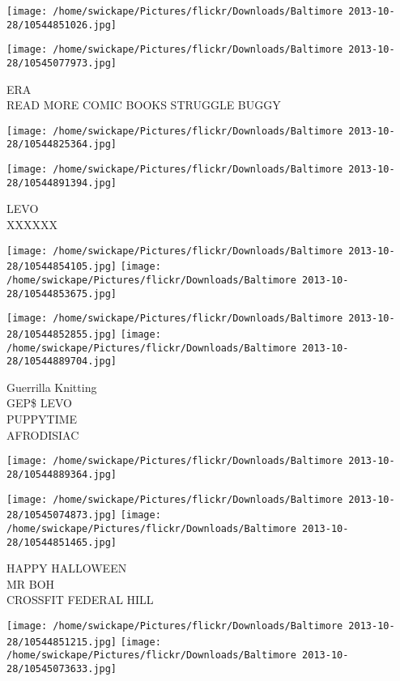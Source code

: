 \documentclass[10pt,letterpaper]{article}
\begin{document}
\texttt{[image: /home/swickape/Pictures/flickr/Downloads/Baltimore 2013-10-28/10544851026.jpg]}

\vspace{0.25in}
\texttt{[image: /home/swickape/Pictures/flickr/Downloads/Baltimore 2013-10-28/10545077973.jpg]}

ERA\\
READ MORE COMIC BOOKS STRUGGLE BUGGY\\
\pagebreak

\texttt{[image: /home/swickape/Pictures/flickr/Downloads/Baltimore 2013-10-28/10544825364.jpg]}

\vspace{0.25in}
\texttt{[image: /home/swickape/Pictures/flickr/Downloads/Baltimore 2013-10-28/10544891394.jpg]}

LEVO\\
XXXXXX\\
\pagebreak

\texttt{[image: /home/swickape/Pictures/flickr/Downloads/Baltimore 2013-10-28/10544854105.jpg]}
\texttt{[image: /home/swickape/Pictures/flickr/Downloads/Baltimore 2013-10-28/10544853675.jpg]}

\texttt{[image: /home/swickape/Pictures/flickr/Downloads/Baltimore 2013-10-28/10544852855.jpg]}
\texttt{[image: /home/swickape/Pictures/flickr/Downloads/Baltimore 2013-10-28/10544889704.jpg]}

Guerrilla Knitting\\
GEP\$ LEVO\\
PUPPYTIME\\
AFRODISIAC\\
\pagebreak

\texttt{[image: /home/swickape/Pictures/flickr/Downloads/Baltimore 2013-10-28/10544889364.jpg]}

\vspace{0.25in}
\texttt{[image: /home/swickape/Pictures/flickr/Downloads/Baltimore 2013-10-28/10545074873.jpg]}
\texttt{[image: /home/swickape/Pictures/flickr/Downloads/Baltimore 2013-10-28/10544851465.jpg]}

HAPPY HALLOWEEN\\
MR BOH\\
CROSSFIT FEDERAL HILL\\
\pagebreak

\texttt{[image: /home/swickape/Pictures/flickr/Downloads/Baltimore 2013-10-28/10544851215.jpg]}
\texttt{[image: /home/swickape/Pictures/flickr/Downloads/Baltimore 2013-10-28/10545073633.jpg]}
\end{document}
